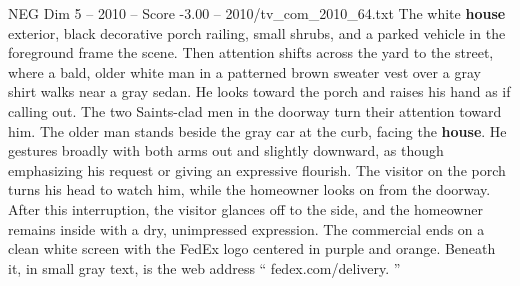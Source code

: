 \begin{textsample}{NEG Dim 5 – 2010 – Score -3.00 – 2010/tv\_com\_2010\_64.txt}
The white \textbf{house} exterior, black decorative porch railing, small shrubs, and a parked vehicle in the foreground frame the scene.
Then attention shifts across the yard to the street, where a bald, older white man in a patterned brown sweater vest over a gray shirt walks near a gray sedan.
He looks toward the porch and raises his hand as if calling out.
The two Saints-clad men in the doorway turn their attention toward him.
The older man stands beside the gray car at the curb, facing the \textbf{house}.
He gestures broadly with both arms out and slightly downward, as though emphasizing his request or giving an expressive flourish.
The visitor on the porch turns his head to watch him, while the homeowner looks on from the doorway.
After this interruption, the visitor glances off to the side, and the homeowner remains inside with a dry, unimpressed expression.
The commercial ends on a clean white screen with the FedEx logo centered in purple and orange.
Beneath it, in small gray text, is the web address “ fedex.com/delivery. ”

\end{textsample}
